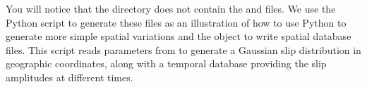 You will notice that the  directory does not
contain the  and
 files. We use the
 Python script to generate these files
as an illustration of how to use Python to generate more simple
spatial variations and the  object to write
spatial database files. This script reads parameters from
 to generate a Gaussian slip
distribution in geographic coordinates, along with a temporal database
providing the slip amplitudes at different times.



